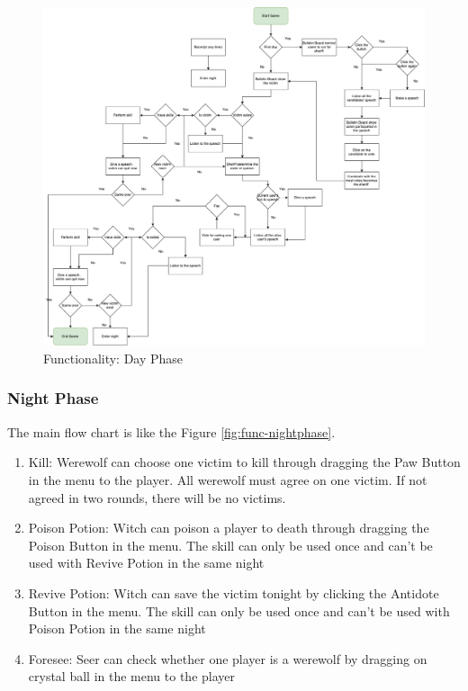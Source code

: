 \documentclass[11pt]{article}
\begin{document}
\begin{figure}
\centering
\includegraphics[width=0.9\linewidth, keepaspectratio]{func-dayphase.pdf}
\caption{Functionality: Day Phase}
\label{fig:func-dayphase}
\end{figure}

\subsubsection{Night Phase}
The main flow chart is like the Figure \ref{fig:func-nightphase}.

\begin{enumerate}
\item
Kill: Werewolf can choose one victim to kill through dragging the Paw Button in the menu to the player. All werewolf must agree on one victim. If not agreed in two rounds, there will be no victims.

\item
Poison Potion: Witch can poison a player to death through dragging the Poison Button in the menu. The skill can only be used once and can't be used with Revive Potion in the same night

\item
Revive Potion: Witch can save the victim tonight by clicking the Antidote Button in the menu. The skill can only be used once and can't be used with Poison Potion in the same night

\item
Foresee: Seer can check whether one player is a werewolf by dragging on crystal ball in the menu to the player
\end{enumerate}
\end{document}
